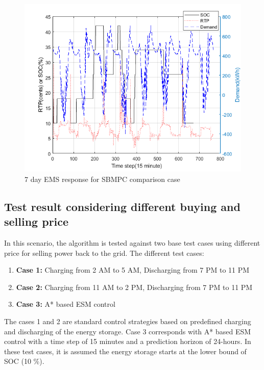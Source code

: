  \begin{figure}[!ht]
    \centering
    \includegraphics[width = \linewidth]{figs/SBMPO_COMP_10_12.png}
    \caption{7 day EMS response for SBMPC comparison case}
    \label{fig:SBMPO_COMP_10_12}
\end{figure}


\subsection{Test result considering different buying and selling price}
In this scenario, the algorithm is tested against two base test cases using different price for selling power back to the grid. The different test cases:
\begin{enumerate}

\item \textbf{Case 1:} Charging from 2 AM to 5 AM, Discharging from 7 PM to 11 PM

\item \textbf{Case 2:} Charging from 11 AM to 2 PM, Discharging from 7 PM to 11 PM

\item \textbf{Case 3:}  A* based ESM control
\end{enumerate}

The cases 1 and 2 are standard control strategies based on predefined charging and discharging of the energy storage. Case 3 corresponds with A* based ESM control with a time step of 15 minutes and a prediction horizon of 24-hours. In these test cases, it is assumed the energy storage starts at the lower bound of SOC (10 \%).

